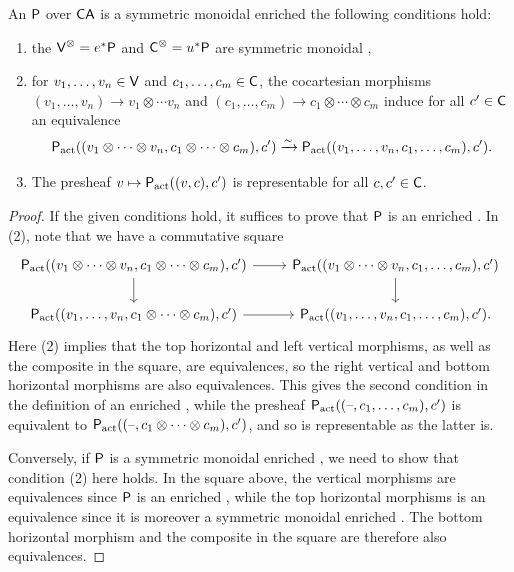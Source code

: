 \documentclass[a4paper,11pt]{article}
\begin{document}
\begin{lemma}\label{lem:SME cond}
  An \iopd{} $\textup{\textsf{P}}$ over $\textup{\textsf{CA}}$ is a symmetric monoidal enriched \icat{}
  \IFF{} the following conditions hold:
  \begin{enumerate}[(1)]
  \item the \iopds{} $\textup{\textsf{V}}^{\otimes} = e^{*}\textup{\textsf{P}}$ and $\textup{\textsf{C}}^{\otimes} = u^{*}\textup{\textsf{P}}$ are symmetric monoidal
    \icats{},
  \item for $v_{1},\dots,v_{n} \in \textup{\textsf{V}}$ and $c_{1},\dots,c_{m} \in
    \textup{\textsf{C}}$, the cocartesian morphisms $(v_{1},\dots,v_{n}) \to v_{1}
    \otimes \cdots v_{n}$ and $(c_{1},\dots,c_{m}) \to c_{1} \otimes
    \cdots \otimes c_{m}$ induce for all $c' \in \textup{\textsf{C}}$ an equivalence
    \[ \oP_{\act}((v_{1} \otimes \cdots \otimes v_{n}, c_{1} \otimes
      \cdots \otimes c_{m}),c') \isoto
      \oP_{\act}((v_{1},\dots,v_{n},c_{1},\dots,c_{m}),c').\]
  \item The presheaf $v \mapsto \textup{\textsf{P}}_{\text{\textup{act}}}((v,c), c')$ is
    representable for all $c,c' \in \textup{\textsf{C}}$.
  \end{enumerate}
\end{lemma}
\begin{proof}
  If the given conditions hold, it suffices to prove that $\textup{\textsf{P}}$ is an
  enriched \iopd{}. In (2), note that we have a commutative square
  \[
    \begin{tikzcd}
     \oP_{\act}((v_{1} \otimes \cdots \otimes v_{n}, c_{1} \otimes
      \cdots \otimes c_{m}),c') \ar[r]
     \ar[d] & \oP_{\act}((v_{1} \otimes \cdots \otimes v_{n},c_{1},\dots,c_{m}),c')  \ar[d] \\
     \oP_{\act}((v_{1},\dots,v_{n},c_{1} \otimes \cdots \otimes c_{m}),c') \ar[r] & \oP_{\act}((v_{1},\dots,v_{n},c_{1},\dots,c_{m}),c').
    \end{tikzcd}
  \]
  Here (2) implies that
  the top horizontal and left vertical
  morphisms, as well as the composite in the square, are equivalences,
  so the right vertical and bottom horizontal morphisms are also
  equivalences. This gives the second condition in the definition of
  an enriched \iopd{}, while the presheaf
  $ \textup{\textsf{P}}_{\text{\textup{act}}}((\text{\textendash}, c_{1},\dots,c_{m}), c')$ is equivalent to
  $\textup{\textsf{P}}_{\text{\textup{act}}}((\text{\textendash}, c_{1}\otimes \cdots \otimes c_{m}), c')$, and so
  is representable as the latter is.

  Conversely, if $\textup{\textsf{P}}$ is a symmetric monoidal enriched \icat{}, we
  need to show that condition (2) here holds. In the square above, the
  vertical morphisms are equivalences since $\textup{\textsf{P}}$ is an enriched
  \iopd{}, while the top horizontal morphisms is an equivalence since
  it is moreover a symmetric monoidal enriched \icat{}. The bottom
  horizontal morphism and the composite in the square are therefore
  also equivalences.
\end{proof}
\end{document}
